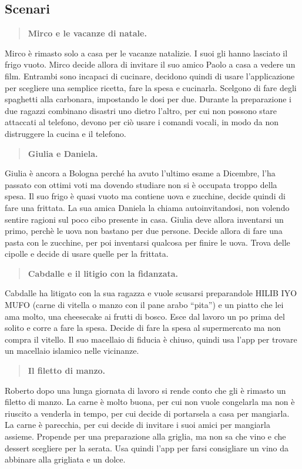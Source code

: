 \subsection{Scenari}
\begin{quote}
	\textbf{Mirco e le vacanze di natale.}
\end{quote}
 Mirco è rimasto solo a casa per le vacanze natalizie. I suoi gli hanno lasciato il frigo vuoto. Mirco decide allora di invitare il suo amico Paolo a casa a vedere un film. Entrambi sono incapaci di cucinare, decidono quindi di usare l’applicazione per scegliere una semplice ricetta, fare la spesa e cucinarla. Scelgono di fare degli spaghetti alla carbonara, impostando le dosi per due. Durante la preparazione i due ragazzi combinano disastri uno dietro l’altro, per cui non possono stare attaccati al telefono, devono per ciò usare i comandi vocali, in modo da non distruggere la cucina e il telefono.
\begin{quote}
	\textbf{Giulia e Daniela.}
\end{quote}
Giulia è ancora a Bologna perché ha avuto l'ultimo esame a Dicembre, l'ha passato con ottimi voti ma dovendo studiare non si è occupata troppo della spesa. Il suo frigo è quasi vuoto ma contiene uova e zucchine, decide quindi di fare una frittata. La sua amica Daniela la chiama autoinvitandosi, non volendo sentire ragioni sul poco cibo presente in casa. Giulia deve allora inventarsi un primo, perchè le uova non bastano per due persone. Decide allora di fare una pasta con le zucchine, per poi inventarsi qualcosa per finire le uova. Trova delle cipolle e decide di usare quelle per la frittata.
\begin{quote}
	\textbf{Cabdalle e il litigio con la fidanzata.}
\end{quote}
Cabdalle ha litigato con la sua ragazza e vuole scusarsi preparandole HILIB IYO MUFO (carne di vitella o manzo con il pane arabo “pita”) e un piatto che lei ama molto, una cheesecake ai frutti di bosco. Esce dal lavoro un po prima del solito e corre a fare la spesa. Decide di fare la spesa al supermercato ma non compra il vitello. Il suo macellaio di fiducia è chiuso, quindi usa l’app per trovare un macellaio islamico nelle vicinanze. 
\begin{quote}
	\textbf{Il filetto di manzo.}
\end{quote}
Roberto dopo una lunga giornata di lavoro si rende conto che gli è rimasto un filetto di manzo. La carne è molto buona, per cui non vuole congelarla ma non è riuscito a venderla in tempo, per cui decide di portarsela a casa per mangiarla.  La carne è parecchia, per cui decide di invitare i suoi amici per mangiarla assieme. Propende per una preparazione alla griglia, ma non sa che vino e che dessert scegliere per la serata. Usa quindi l’app per farsi consigliare un vino da abbinare alla grigliata e un dolce.
